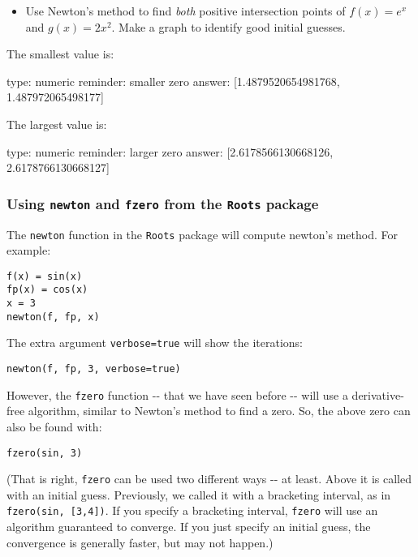 \documentclass[12pt]{article}
\begin{document}
\begin{itemize}
\itemsep1pt\parskip0pt
\item
  Use Newton's method to find \emph{both} positive intersection points
  of $f(x) = e^x$ and $g(x) = 2x^2$. Make a graph to identify good
  initial guesses.
\end{itemize}

The smallest value is:

\begin{answer}
    type: numeric
    reminder: smaller zero
    answer: [1.4879520654981768, 1.487972065498177]

\end{answer}

The largest value is:

\begin{answer}
    type: numeric
    reminder: larger zero
    answer: [2.6178566130668126, 2.6178766130668127]

\end{answer}

\subsubsection{Using \texttt{newton} and \texttt{fzero} from the
\texttt{Roots} package}

The \texttt{newton} function in the \texttt{Roots} package will compute
newton's method. For example:



\begin{verbatim}
f(x) = sin(x)
fp(x) = cos(x)
x = 3
newton(f, fp, x)
\end{verbatim}
The extra argument \texttt{verbose=true} will show the iterations:



\begin{verbatim}
newton(f, fp, 3, verbose=true)
\end{verbatim}
However, the \texttt{fzero} function -{}- that we have seen before -{}-
will use a derivative-free algorithm, similar to Newton's method to find
a zero. So, the above zero can also be found with:



\begin{verbatim}
fzero(sin, 3)
\end{verbatim}
(That is right, \texttt{fzero} can be used two different ways -{}- at
least. Above it is called with an initial guess. Previously, we called
it with a bracketing interval, as in \texttt{fzero(sin, {[}3,4{]})}. If
you specify a bracketing interval, \texttt{fzero} will use an algorithm
guaranteed to converge. If you just specify an initial guess, the
convergence is generally faster, but may not happen.)
\end{document}
